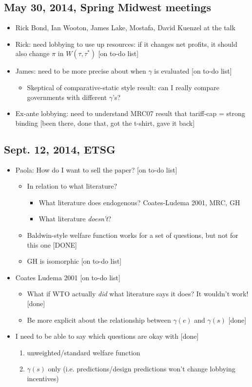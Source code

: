 \documentclass[12pt]{article}
\newcommand{\ga}{\gamma}
\begin{document}
\subsection{May 30, 2014, Spring Midwest meetings}
\begin{itemize}
	\item Rick Bond, Ian Wooton, James Lake, Mostafa, David Kuenzel at the talk
	\item Rick: need lobbying to use up resources: if it changes net profits, it should also change $\pi$ in $W(\tau,\tau^*)$ [on to-do list]
	\item James: need to be more precise about when $\ga$ is evaluated [on to-do list]
		\begin{itemize}
			\item Skeptical of comparative-static style result: can I really compare governments with different $\ga$'s?
		\end{itemize}
	\item Ex-ante lobbying: need to understand MRC07 result that tariff-cap = strong binding [been there, done that, got the t-shirt, gave it back]
\end{itemize}

\subsection{Sept. 12, 2014, ETSG}
\begin{itemize}
	\item Paola: How do I want to sell the paper? [on to-do list]
		\begin{itemize}
			\item In relation to what literature?
				\begin{itemize}
					\item What literature does endogenous? Coates-Ludema 2001, MRC, GH
					\item What literature \textit{doesn't}?
				\end{itemize}
			\item Baldwin-style welfare function works for a set of questions, but not for this one [DONE]
			\item GH is isomorphic [on to-do list]
		\end{itemize}
	\item Coates Ludema 2001 [on to-do list]
		\begin{itemize}
			\item What if WTO actually \textit{did} what literature says it does? It wouldn't work! [done]
			\item Be more explicit about the relationship between $\ga(e)$ and $\ga(s)$ [done]
		\end{itemize}
	\item I need to be able to say which questions are okay with [done]
		\begin{enumerate}
			\item unweighted/standard welfare function
			\item $\ga(s)$ only (i.e. predictions/design predictions won't change lobbying incentives) 
		\end{enumerate}
\end{itemize}
\end{document}
